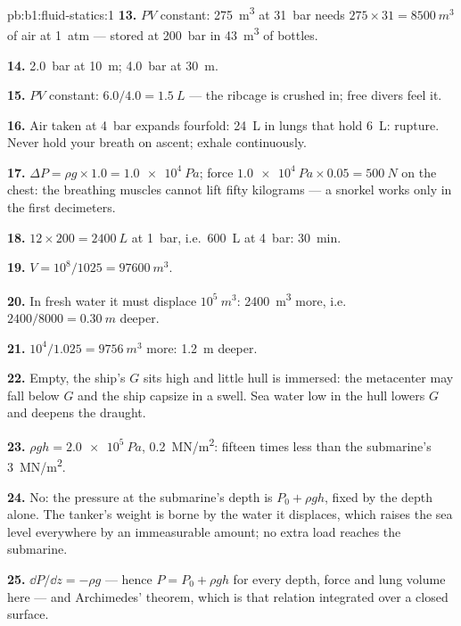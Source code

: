 \begin{solution}{pb:b1:fluid-statics:1}
\textbf{13.} $PV$ constant: \qty{275}{m^3} at \qty{31}{bar} needs $275 \times 31
= \qty{8500}{m^3}$ of air at \qty{1}{atm} --- stored at \qty{200}{bar} in
\qty{43}{m^3} of bottles.

\textbf{14.} \qty{2.0}{bar} at \qty{10}{m}; \qty{4.0}{bar} at \qty{30}{m}.

\textbf{15.} $PV$ constant: $6.0/4.0 = \qty{1.5}{L}$ --- the ribcage is
crushed in; free divers feel it.

\textbf{16.} Air taken at \qty{4}{bar} expands fourfold: \qty{24}{L} in lungs
that hold \qty{6}{L}: rupture. Never hold your breath on ascent; exhale
continuously.

\textbf{17.} $\Delta P = \rho g \times 1.0 = \qty{1.0e4}{Pa}$; force $\qty{1.0e4}{Pa}
\times 0.05 = \qty{500}{N}$ on the chest: the breathing muscles cannot
lift fifty kilograms --- a snorkel works only in the first decimeters.

\textbf{18.} $12 \times 200 = \qty{2400}{L}$ at \qty{1}{bar}, i.e.\ \qty{600}{L}
at \qty{4}{bar}: \qty{30}{min}.

\textbf{19.} $V = 10^8/1025 = \qty{97600}{m^3}$.

\textbf{20.} In fresh water it must displace $10^5\ \unit{m^3}$: \qty{2400}{m^3}
more, i.e.\ $2400/8000 = \qty{0.30}{m}$ deeper.

\textbf{21.} $10^4/1.025 = \qty{9756}{m^3}$ more: \qty{1.2}{m} deeper.

\textbf{22.} Empty, the ship's $G$ sits high and little hull is immersed:
the metacenter may fall below $G$ and the ship capsize in a swell. Sea
water low in the hull lowers $G$ and deepens the draught.

\textbf{23.} $\rho gh = \qty{2.0e5}{Pa}$, \qty{0.2}{MN/m^2}: fifteen times less
than the submarine's \qty{3}{MN/m^2}.

\textbf{24.} No: the pressure at the submarine's depth is $P_0 + \rho gh$,
fixed by the depth alone. The tanker's weight is borne by the water it
displaces, which raises the sea level everywhere by an immeasurable
amount; no extra load reaches the submarine.

\textbf{25.} $\dd P/\dd z = -\rho g$ --- hence $P = P_0 + \rho gh$ for every
depth, force and lung volume here --- and Archimedes' theorem, which is
that relation integrated over a closed surface.
\end{solution}

